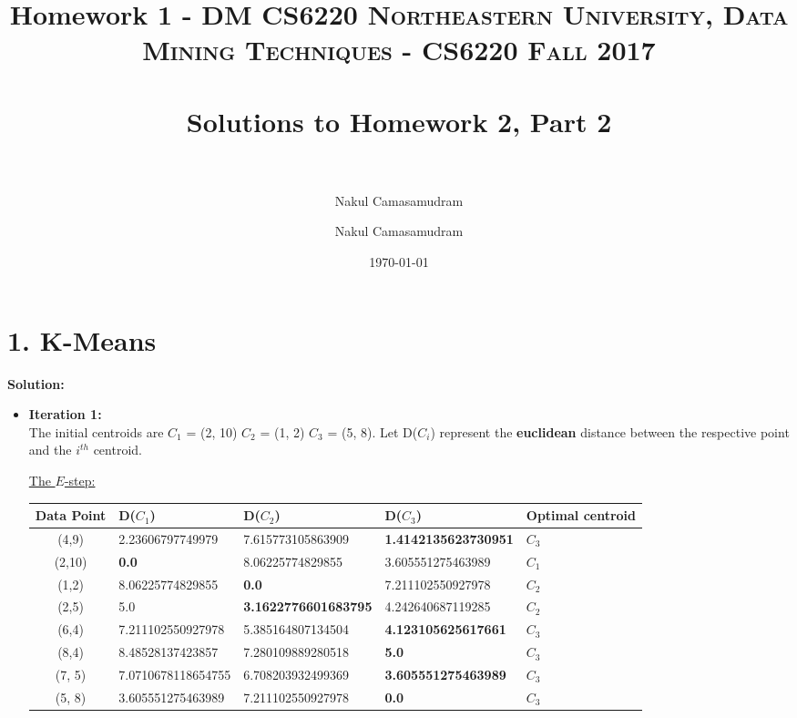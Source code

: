 \documentclass[11pt]{article}
\title{Homework 1 - DM CS6220}
\author{Nakul Camasamudram}
\title{	
	\normalfont \normalsize 
	\textsc{Northeastern University, Data Mining Techniques - CS6220 Fall 2017} \\
	\horrule{0.5pt} \\[0.4cm] %
	\huge Solutions to Homework 2, Part 2 \\ %
	\horrule{2pt} \\[0.5cm] %
	}
\author{Nakul Camasamudram} %
\date{\normalsize\today} %
\begin{document}
	
	\maketitle %
	\newpage
	
	
	\section*{1. K-Means}

	\textbf{Solution:}\\
    
    \begin{itemize}
    	\item \textbf{Iteration 1:} \\
    	The initial centroids are $C_1$ = (2, 10) $C_2$ = (1, 2) $C_3$ = (5, 8). Let D($C_i$) represent the \textbf{euclidean} distance between the respective point and the $i^{th}$ centroid.
    	
		\underline{The $E$-step:} \\
    		\begin{center}
    			\begin{adjustbox}{max width=\textwidth}
				\begin{tabular}{ | c | l | l | l | l |}
	  	 		\hline
    				\textbf{Data Point} & \textbf{D($C_1$)} & \textbf{D($C_2$)} & \textbf{D($C_3$)} & \textbf{Optimal centroid} \\ 
    			\hline
    				(4,9) & 2.23606797749979 & 7.615773105863909 & \textbf{1.4142135623730951} & $C_3$ \\ 
    			\hline
    				(2,10) & \textbf{0.0} & 8.06225774829855 & 3.605551275463989 & $C_1$ \\ 
    			\hline
					(1,2) & 8.06225774829855 & \textbf{0.0} & 7.211102550927978 & $C_2$ \\ 
    			\hline   
    				(2,5) & 5.0 & \textbf{3.1622776601683795} & 4.242640687119285 & $C_2$ \\ 
    			\hline
	    			(6,4) & 7.211102550927978 & 5.385164807134504 & \textbf{4.123105625617661} & $C_3$ \\ 
    			\hline
    				(8,4) & 8.48528137423857 & 7.280109889280518 & \textbf{5.0} & $C_3$ \\ 
    			\hline
    				(7, 5) & 7.0710678118654755 & 6.708203932499369 & \textbf{3.605551275463989} & $C_3$ \\ 
    			\hline 	
    				(5, 8) & 3.605551275463989 & 7.211102550927978 & \textbf{0.0} & $C_3$ \\ 
    			\hline 					
    			\end{tabular}
    			\end{adjustbox}
		\end{center}
		

\end{itemize}
\end{document}
